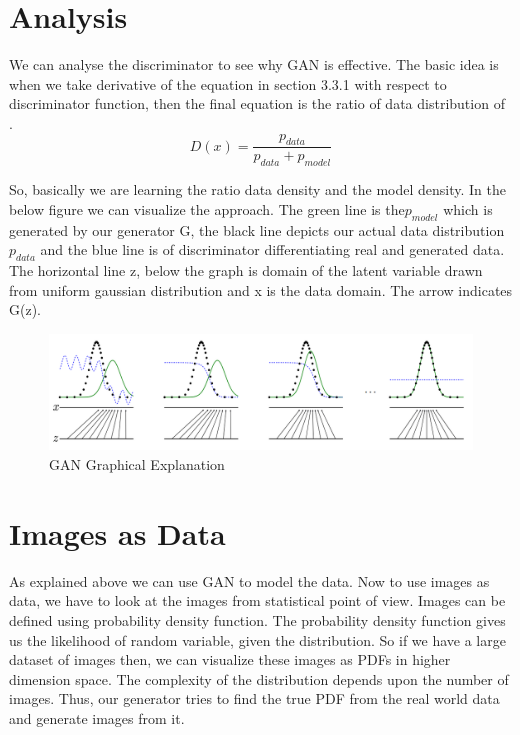 \section{Analysis}

We can analyse the discriminator to see why GAN is effective. The basic idea is when we take derivative of the equation in section 3.3.1 with respect to discriminator function, then the final equation is the ratio of data distribution of .
$$ D(x) =\frac{p_{data}}{p_{data} + p_{model}}$$

So, basically we are learning the ratio data density and the model density. In the below figure we can visualize the approach. The green  line is the$p_{model}$ which is generated by our generator G, the black line depicts our actual data distribution $p_{data}$ and the blue line is of discriminator differentiating real and generated data. The horizontal line z, below the graph is domain of the latent variable drawn from uniform gaussian %
distribution and x is the data domain. The arrow indicates G(z). 
\begin{figure}
  \centering
    \includegraphics[scale=.4, angle=0]{Files/GAN-Visualize.png}
    \caption[GAN Algorithm Visualization]{ GAN Graphical Explanation\cite{Gan-overview}}
    \label{fig: GAN Graphical Explanation}
\end{figure}

\section{Images as Data}

As explained above we can use GAN to model the data. Now to use images as data, we have to look at the images from statistical point of view.  Images can be defined using probability density function. The probability density function gives us the likelihood of random variable, given the distribution. So if we have a large dataset of images then, we can visualize these images as PDFs in higher dimension space.
The complexity of the distribution depends upon the number of images. Thus, our generator tries to find the true PDF from the real world data and generate images from it.
